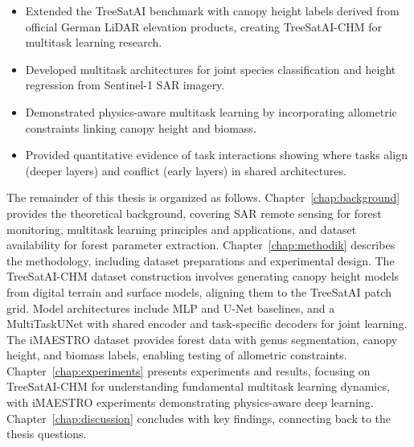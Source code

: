 \begin{itemize}
    \item Extended the TreeSatAI benchmark with canopy height labels derived from official German LiDAR elevation products, creating TreeSatAI-CHM for multitask learning research.
    \item Developed multitask architectures for joint species classification and height regression from Sentinel-1 SAR imagery.
    \item Demonstrated physics-aware multitask learning by incorporating allometric constraints linking canopy height and biomass.
    \item Provided quantitative evidence of task interactions showing where tasks align (deeper layers) and conflict (early layers) in shared architectures.
\end{itemize}

The remainder of this thesis is organized as follows. Chapter~\ref{chap:background} provides the theoretical background, covering SAR remote sensing for forest monitoring, multitask learning principles and applications, and dataset availability for forest parameter extraction. Chapter~\ref{chap:methodik} describes the methodology, including dataset preparations and experimental design. The TreeSatAI-CHM dataset construction involves generating canopy height models from digital terrain and surface models, aligning them to the TreeSatAI patch grid. Model architectures include MLP and U-Net baselines, and a MultiTaskUNet with shared encoder and task-specific decoders for joint learning. The iMAESTRO dataset provides forest data with genus segmentation, canopy height, and biomass labels, enabling testing of allometric constraints. Chapter~\ref{chap:experiments} presents experiments and results, focusing on TreeSatAI-CHM for understanding fundamental multitask learning dynamics, with iMAESTRO experiments demonstrating physics-aware deep learning. Chapter~\ref{chap:discussion} concludes with key findings, connecting back to the thesis questions.
